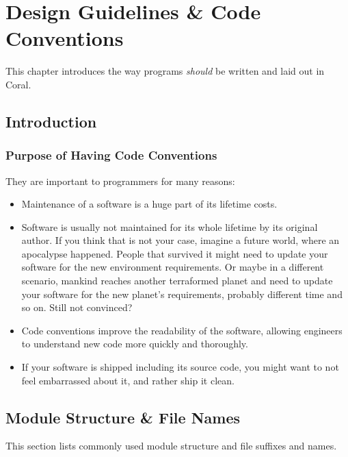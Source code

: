 
\chapter{Design Guidelines \& Code Conventions}

This chapter introduces the way programs {\em should} be written and laid out in Coral. 






\section{Introduction}

\subsection{Purpose of Having Code Conventions}

They are important to programmers for many reasons:
\begin{itemize}
\item Maintenance of a software is a huge part of its lifetime costs. 
\item Software is usually not maintained for its whole lifetime by its original author. If you think that is not your case, imagine a future world, where an apocalypse happened. People that survived it might need to update your software for the new environment requirements. Or maybe in a different scenario, mankind reaches another terraformed planet and need to update your software for the new planet’s requirements, probably different time and so on. Still not convinced? 
\item Code conventions improve the readability of the software, allowing engineers to understand new code more quickly and thoroughly. 
\item If your software is shipped including its source code, you might want to not feel embarrassed about it, and rather ship it clean. 
\end{itemize}






\section{Module Structure \& File Names}

This section lists commonly used module structure and file suffixes and names. 

